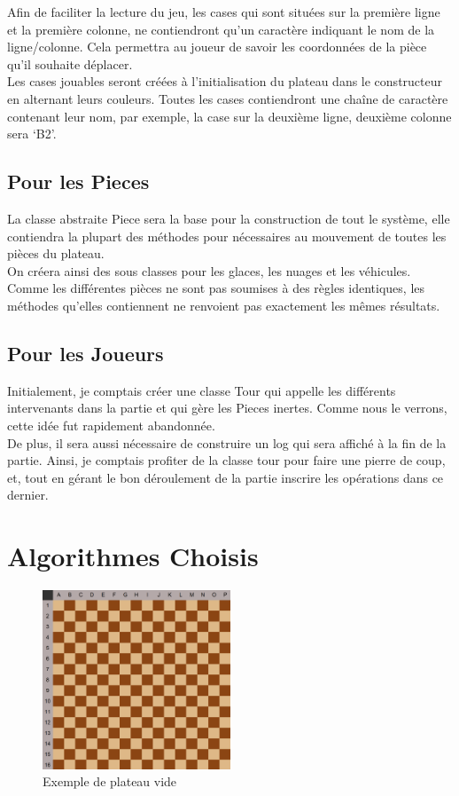 \documentclass[titlepage]{report}
\begin{document}
Afin de faciliter la lecture du jeu, les cases qui sont situées sur la première ligne et la première colonne, ne contiendront qu’un caractère indiquant le nom de la ligne/colonne. Cela permettra au joueur de savoir les coordonnées de la pièce qu’il souhaite déplacer.  \\

Les cases jouables seront créées à l’initialisation du plateau dans le constructeur en alternant leurs couleurs. Toutes les cases contiendront une chaîne de caractère contenant leur nom, par exemple, la case sur la deuxième ligne, deuxième colonne sera ‘B2’. 

\section{Pour les Pieces}
La classe abstraite Piece sera la base pour la construction de tout le système, elle contiendra la plupart des méthodes pour nécessaires au mouvement de toutes les pièces du plateau. \\

On créera ainsi des sous classes pour les glaces, les nuages et les véhicules. Comme les différentes pièces ne sont pas soumises à des règles identiques, les méthodes qu’elles contiennent ne renvoient pas exactement les mêmes résultats. 

\section{Pour les Joueurs}
Initialement, je comptais créer une classe Tour qui appelle les différents intervenants dans la partie et qui gère les Pieces inertes. Comme nous le verrons, cette idée fut rapidement abandonnée. \\

De plus, il sera aussi nécessaire de construire un log qui sera affiché à la fin de la partie. Ainsi, je comptais profiter de la classe tour pour faire une pierre de coup, et, tout en gérant le bon déroulement de la partie inscrire les opérations dans ce dernier. 

\chapter{Algorithmes Choisis}
\begin{figure}[h]
    \centering
    \includegraphics[width=0.5\textwidth]{img/plateau_vide.PNG}
    \caption{Exemple de plateau vide}
\end{figure}
\end{document}
